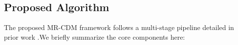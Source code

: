





\subsection{Proposed Algorithm}
The proposed MR-CDM framework follows a multi-stage pipeline detailed in prior work .We briefly summarize the core components here:

